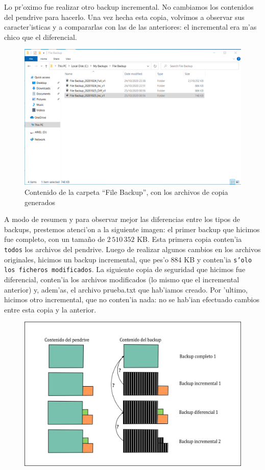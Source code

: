 \documentclass[11pt]{article}
\begin{document}
    Lo pr'oximo fue realizar otro backup incremental. No cambiamos los contenidos del pendrive para hacerlo. Una vez hecha esta copia, volvimos a observar sus caracter'isticas y a compararlas con las de las anteriores: el incremental era m'as chico que el diferencial.

    \begin{figure}[H]
		\centering
		\includegraphics[width=.8\textwidth]{Images/easeus/pendrive/11-t2_dir_3.png}
		\caption{Contenido de la carpeta ``File Backup'', con los archivos de copia generados}
		\label{imagenes_t2}
	\end{figure}
	
	A modo de resumen y para observar mejor las diferencias entre los tipos de backups, prestemos atenci'on a la siguiente imagen: el primer backup que hicimos fue completo, con un tamaño de $2\,510\,352$ KB. Esta primera copia conten'ia \texttt{todos} los archivos del pendrive. Luego de realizar algunos cambios en los archivos originales, hicimos un backup incremental, que pes'o 884 KB y conten'ia \texttt{s'olo los ficheros modificados}.
    La siguiente copia de seguridad que hicimos fue diferencial, conten'ia los archivos modificados (lo mismo que el incremental anterior) y, adem'as, el archivo prueba.txt que hab'iamos creado.
    Por 'ultimo, hicimos otro incremental, que no conten'ia nada: no se hab'ian efectuado cambios entre esta copia y la anterior.
    
    \begin{figure}[H]
		\centering
		\includegraphics[width=.8\textwidth]{Images/easeus/pendrive/12-bp_tipos.png}
	\end{figure}
	
\end{document}
